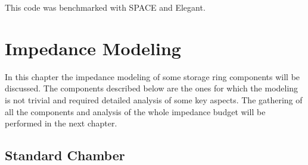     This code was benchmarked with SPACE\cite{Bassi2016} and Elegant\cite{Borland2000}.


\chapter{Impedance Modeling}\label{cap:impedance_modeling}

    In this chapter the impedance modeling of some storage ring components will be discussed. The components described below are the ones for which the modeling is not trivial and required detailed analysis of some key aspects. The gathering of all the components and analysis of the whole impedance budget will be performed in the next chapter.

\section{Standard Chamber}\label{sec:standard_chamber}

